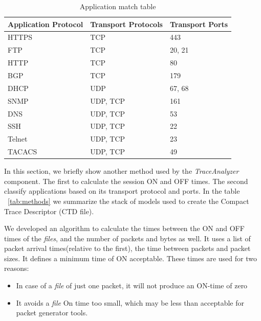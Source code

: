 \begin{table}[ht!]
    \centering
    \caption{Application match table}
    \label{tab:application-protocols}
    \begin{tabular}{lll}
        \hline
        Application Protocol & Transport Protocols & Transport Ports \\ \hline
        HTTPS               & TCP                & 443             \\
        FTP                 & TCP                & 20, 21          \\
        HTTP                & TCP                & 80              \\
        BGP                 & TCP                & 179             \\
        DHCP                & UDP                & 67, 68          \\
        SNMP                & UDP, TCP           & 161             \\
        DNS                 & UDP, TCP           & 53              \\
        SSH                 & UDP, TCP           & 22              \\
        Telnet              & UDP, TCP           & 23              \\
        TACACS              & UDP, TCP           & 49              \\ \hline
    \end{tabular}
\end{table}




In this section, we briefly show another method used by the \textit{TraceAnalyzer} component. The first to calculate the session ON and OFF times. The second classify applications based on its transport protocol and ports. In the table ~\ref{tab:methods} we summarize the stack of models used to create the Compact Trace Descriptor (CTD file). 



We developed an algorithm to calculate the times between the ON and OFF times of the \textit{files}, and the number of packets and bytes as well. It uses a list of packet arrival times(relative to the first), the time between packets and packet sizes. It defines a minimum time of ON acceptable. These times are used for two reasons:

\begin{itemize}
\item In case of a \textit{file} of just one packet, it will not produce an ON-time of zero
\item It avoids a \textit{file} On time too small, which may be less than acceptable for packet generator tools.
\end{itemize}

